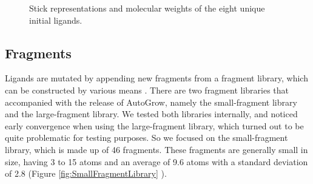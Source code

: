 \begin{figure}
{  \label{subfig:Ligands-ZINC08442219}
}
\caption{Stick representations and molecular weights of the eight unique initial ligands.}
\label{fig:InitialLigands}
\end{figure}

\subsection{Fragments}

Ligands are mutated by appending new fragments from a fragment library, which can be constructed by various means \citep{470-2009,751-2011,656-2011}. There are two fragment libraries that accompanied with the release of AutoGrow, namely the small-fragment library and the large-fragment library. We tested both libraries internally, and noticed early convergence when using the large-fragment library, which turned out to be quite problematic for testing purposes. So we focused on the small-fragment library, which is made up of 46 fragments. These fragments are generally small in size, having 3 to 15 atoms and an average of 9.6 atoms with a standard deviation of 2.8 (Figure \ref{fig:SmallFragmentLibrary} \citep{466-2009}).

